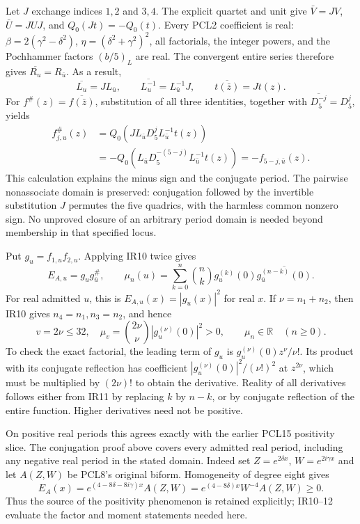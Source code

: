 \documentclass[11pt]{article}
\newcommand{\R}{\mathbb R}
\begin{document}
Let $J$ exchange indices $1,2$ and $3,4$. The explicit quartet and
unit give $\bar V=JV$, $\bar U=JUJ$, and $Q_0(Jt)=-Q_0(t)$.
Every PCL2 coefficient is real: $\beta=2(\gamma^2-\delta^2)$,
$\eta=(\delta^2+\gamma^2)^2$, all factorials, the integer powers,
and the Pochhammer factors $(b/5)_L$ are real. The convergent entire
series therefore gives $\overline{R_u}=R_{\bar u}$. As a result,
\[
 \overline{L_u}=JL_{\bar u},\qquad
 \overline{L_u^{-1}}=L_{\bar u}^{-1}J,\qquad
 \overline{t(\bar z)}=Jt(z).
 \tag{IR9}
\]
For $f^\#(z)=\overline{f(\bar z)}$, substitution of all three
identities, together with $\overline{D_5^{-j}}=D_5^j$, yields
\[
 \begin{split}
 f_{j,u}^{\#}(z)
 &=Q_0\!\left(JL_{\bar u}D_5^jL_{\bar u}^{-1}t(z)\right)\\
 &=-Q_0\!\left(L_{\bar u}D_5^{-(5-j)}L_{\bar u}^{-1}t(z)\right)
 =-f_{5-j,\bar u}(z).
 \end{split}\tag{IR10}
\]
This calculation explains the minus sign and the conjugate period.
The pairwise nonassociate domain is preserved: conjugation followed
by the invertible substitution $J$ permutes the five quadrics, with
the harmless common nonzero sign. No unproved closure of an arbitrary
period domain is needed beyond membership in that specified locus.

Put $g_u=f_{1,u}f_{2,u}$. Applying IR10 twice gives
\[
 E_{A,u}=g_u g_{\bar u}^{\#},\qquad
 \mu_n(u)=\sum_{k=0}^n\binom nk
 g_u^{(k)}(0)\overline{g_{\bar u}^{(n-k)}(0)}.
 \tag{IR11}
\]
For real admitted $u$, this is $E_{A,u}(x)=|g_u(x)|^2$ for real $x$.
If $\nu=n_1+n_2$, then IR10 gives $n_4=n_1,n_3=n_2$, and hence
\[
 v=2\nu\le32,\quad
 \mu_v=\binom{2\nu}{\nu}|g_u^{(\nu)}(0)|^2>0,\qquad
 \mu_n\in\R\quad(n\ge0).
 \tag{IR12}
\]
To check the exact factorial, the leading term of $g_u$ is
$g_u^{(\nu)}(0)z^\nu/\nu!$. Its product with its conjugate
reflection has coefficient $|g_u^{(\nu)}(0)|^2/(\nu!)^2$ at
$z^{2\nu}$, which must be multiplied by $(2\nu)!$ to obtain
the derivative. Reality of all derivatives follows either from
IR11 by replacing $k$ by $n-k$, or by conjugate reflection of
the entire function. Higher derivatives need not be positive.

On positive real periods this agrees exactly with the earlier PCL15
positivity slice. The conjugation proof above covers every admitted
real period, including any negative real period in the stated domain. Indeed
set $Z=e^{2\delta x}$, $W=e^{2i\gamma x}$ and let $A(Z,W)$ be
PCL8's original biform. Homogeneity of degree eight gives
\[
 E_A(x)=e^{(4-8\delta-8i\gamma)x}A(Z,W)
       =e^{(4-8\delta)x}W^{-4}A(Z,W)\ge0.
 \tag{IR13}
\]
Thus the source of the positivity phenomenon is retained explicitly;
IR10--12 evaluate the factor and moment statements needed here.
\end{document}
